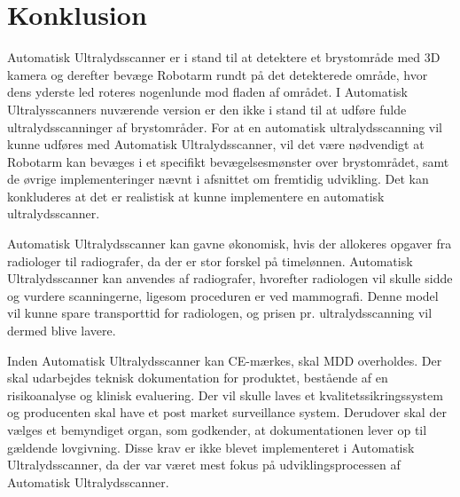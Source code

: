 \chapter{Konklusion}\label{kapitel_Konklusion}
Automatisk Ultralydsscanner er i stand til at detektere et brystområde med 3D kamera og derefter bevæge Robotarm rundt på det detekterede område, hvor dens yderste led roteres nogenlunde mod fladen af området. I Automatisk Ultralysscanners nuværende version er den ikke i stand til at udføre fulde ultralydsscanninger af brystområder. For at en automatisk ultralydsscanning vil kunne udføres med Automatisk Ultralydsscanner, vil det være nødvendigt at Robotarm kan bevæges i et specifikt bevægelsesmønster over brystområdet, samt de øvrige implementeringer nævnt i afsnittet om fremtidig udvikling. Det kan konkluderes at det er realistisk at kunne implementere en automatisk ultralydsscanner. 

Automatisk Ultralydsscanner kan gavne økonomisk, hvis der allokeres opgaver fra radiologer til radiografer, da der er stor forskel på timelønnen. Automatisk Ultralydsscanner kan anvendes af radiografer, hvorefter radiologen vil skulle sidde og vurdere scanningerne, ligesom proceduren er ved mammografi. Denne model vil kunne spare transporttid for radiologen, og prisen pr. ultralydsscanning vil dermed blive lavere.  

Inden Automatisk Ultralydsscanner kan CE-mærkes, skal MDD overholdes. Der skal udarbejdes teknisk dokumentation for produktet, bestående af en risikoanalyse og klinisk evaluering. Der vil skulle laves et kvalitetssikringssystem og producenten skal have et post market surveillance system. Derudover skal der vælges et bemyndiget organ, som godkender, at dokumentationen lever op til gældende lovgivning. Disse krav er ikke blevet implementeret i Automatisk Ultralydsscanner, da der var været mest fokus på udviklingsprocessen af Automatisk Ultralydsscanner. 

